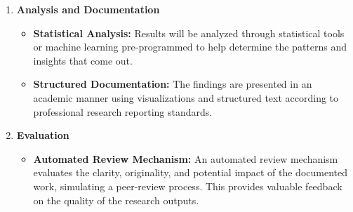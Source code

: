 \begin{enumerate}
    \item \textbf{Analysis and Documentation}
    \begin{itemize}
        \item \textbf{Statistical Analysis:} Results will be analyzed through statistical tools or machine learning pre-programmed to help determine the patterns and insights that come out.
        \item \textbf{Structured Documentation:} The findings are presented in an academic manner using visualizations and structured text according to professional research reporting standards.
    \end{itemize}

    \item \textbf{Evaluation}
    \begin{itemize}
        \item \textbf{Automated Review Mechanism:} An automated review mechanism evaluates the clarity, originality, and potential impact of the documented work, simulating a peer-review process. This provides valuable feedback on the quality of the research outputs.
    \end{itemize}
\end{enumerate}

